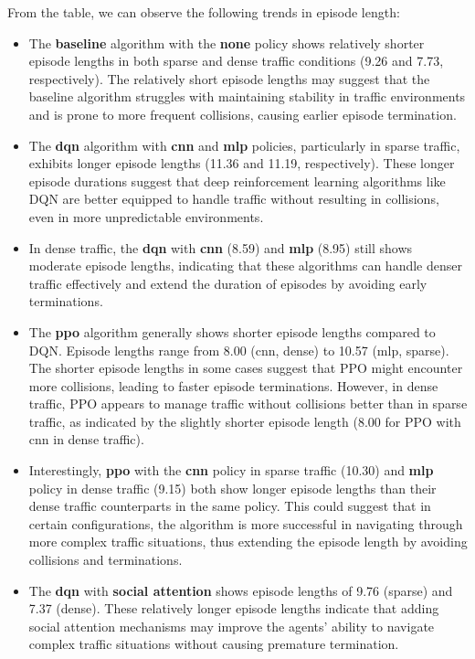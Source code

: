 From the table, we can observe the following trends in episode length:

\begin{itemize}
    \item The \textbf{baseline} algorithm with the \textbf{none} policy shows relatively shorter episode lengths in both sparse and dense traffic conditions (9.26 and 7.73, respectively). The relatively short episode lengths may suggest that the baseline algorithm struggles with maintaining stability in traffic environments and is prone to more frequent collisions, causing earlier episode termination.
    \item The \textbf{dqn} algorithm with \textbf{cnn} and \textbf{mlp} policies, particularly in sparse traffic, exhibits longer episode lengths (11.36 and 11.19, respectively). These longer episode durations suggest that deep reinforcement learning algorithms like DQN are better equipped to handle traffic without resulting in collisions, even in more unpredictable environments.
    \item In dense traffic, the \textbf{dqn} with \textbf{cnn} (8.59) and \textbf{mlp} (8.95) still shows moderate episode lengths, indicating that these algorithms can handle denser traffic effectively and extend the duration of episodes by avoiding early terminations.
    \item The \textbf{ppo} algorithm generally shows shorter episode lengths compared to DQN. Episode lengths range from 8.00 (cnn, dense) to 10.57 (mlp, sparse). The shorter episode lengths in some cases suggest that PPO might encounter more collisions, leading to faster episode terminations. However, in dense traffic, PPO appears to manage traffic without collisions better than in sparse traffic, as indicated by the slightly shorter episode length (8.00 for PPO with cnn in dense traffic).
    \item Interestingly, \textbf{ppo} with the \textbf{cnn} policy in sparse traffic (10.30) and \textbf{mlp} policy in dense traffic (9.15) both show longer episode lengths than their dense traffic counterparts in the same policy. This could suggest that in certain configurations, the algorithm is more successful in navigating through more complex traffic situations, thus extending the episode length by avoiding collisions and terminations.
    \item The \textbf{dqn} with \textbf{social attention} shows episode lengths of 9.76 (sparse) and 7.37 (dense). These relatively longer episode lengths indicate that adding social attention mechanisms may improve the agents' ability to navigate complex traffic situations without causing premature termination.
\end{itemize}

